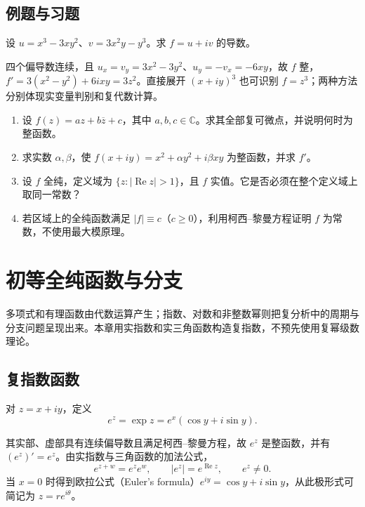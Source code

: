 \documentclass[UTF8,12pt,a4paper,fontset=fandol]{ctexbook}
\begin{document}
\section{例题与习题}

\begin{example}[识别一个整函数]
设 $u=x^3-3xy^2$、$v=3x^2y-y^3$。求 $f=u+iv$ 的导数。
\end{example}
\begin{solve}
四个偏导数连续，且 $u_x=v_y=3x^2-3y^2$、$u_y=-v_x=-6xy$，故 $f$ 整，$f'=3(x^2-y^2)+6ixy=3z^2$。直接展开 $(x+iy)^3$ 也可识别 $f=z^3$；两种方法分别体现实变量判别和复代数计算。
\end{solve}

\begin{enumerate}
  \item\label{ex:ca-affine} 设 $f(z)=az+b\overline z+c$，其中 $a,b,c\in\mathbb{C}$。求其全部复可微点，并说明何时为整函数。
  \item\label{ex:ca-c1-criterion} 求实数 $\alpha,\beta$，使 $f(x+iy)=x^2+\alpha y^2+i\beta xy$ 为整函数，并求 $f'$。
  \item\label{ex:ca-real-constant} 设 $f$ 全纯，定义域为 $\{z:|\operatorname{Re}z|>1\}$，且 $f$ 实值。它是否必须在整个定义域上取同一常数？
  \item\label{ex:ca-modulus-constant} 若区域上的全纯函数满足 $|f|\equiv c$（$c\ge0$），利用柯西--黎曼方程证明 $f$ 为常数，不使用最大模原理。
\end{enumerate}

\chapter{初等全纯函数与分支}
\label{chap:ca-elementary}

多项式和有理函数由代数运算产生；指数、对数和非整数幂则把复分析中的周期与分支问题呈现出来。本章用实指数和实三角函数构造复指数，不预先使用复幂级数理论。

\section{复指数函数}

\begin{definition}[复指数]
对 $z=x+iy$，定义
\begin{equation}
 e^z=\exp z=e^x(\cos y+i\sin y).
 \label{eq:ca-exponential}
\end{equation}
\end{definition}
其实部、虚部具有连续偏导数且满足柯西--黎曼方程，故 $e^z$ 是整函数，并有 $(e^z)'=e^z$。由实指数与三角函数的加法公式，
\[
 e^{z+w}=e^ze^w,\qquad |e^z|=e^{\operatorname{Re}z},\qquad e^z\ne0.
\]
当 $x=0$ 时得到欧拉公式（Euler's formula）$e^{iy}=\cos y+i\sin y$，从此极形式可简记为 $z=re^{i\theta}$。
\end{document}
